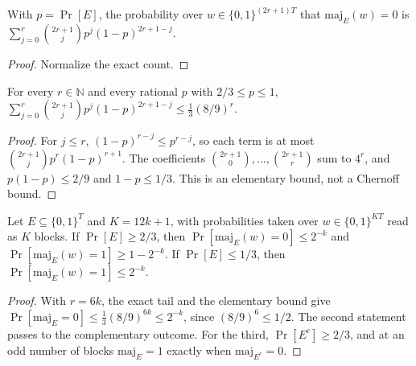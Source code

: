 \begin{lemma}
  \label{lem:encodings-majority-tail}
  \leanok
  With $p = \Pr[E]$, the probability over $w \in \{0,1\}^{(2r+1)T}$ that
  $\mathrm{maj}_E(w) = 0$ is
  $\sum_{j=0}^{r} \binom{2r+1}{j} p^j (1-p)^{2r+1-j}$.
\end{lemma}
\begin{proof}
  \leanok
  Normalize the exact count.
\end{proof}

\begin{lemma}
  \label{lem:encodings-binomial-tail}
  \leanok
  For every $r \in \mathbb{N}$ and every rational $p$ with
  $2/3 \le p \le 1$,
  $\sum_{j=0}^{r} \binom{2r+1}{j} p^j (1-p)^{2r+1-j} \le \frac13 (8/9)^r$.
\end{lemma}
\begin{proof}
  \leanok
  For $j \le r$, $(1-p)^{r-j} \le p^{r-j}$, so each term is at most
  $\binom{2r+1}{j} p^r (1-p)^{r+1}$. The coefficients
  $\binom{2r+1}{0}, \dots, \binom{2r+1}{r}$ sum to $4^r$, and
  $p(1-p) \le 2/9$ and $1 - p \le 1/3$. This is an elementary bound, not a
  Chernoff bound.
\end{proof}

\begin{theorem}
  \label{thm:encodings-amplification}
  \leanok
  Let $E \subseteq \{0,1\}^T$ and $K = 12k + 1$, with probabilities taken
  over $w \in \{0,1\}^{KT}$ read as $K$ blocks. If $\Pr[E] \ge 2/3$, then
  $\Pr[\mathrm{maj}_E(w) = 0] \le 2^{-k}$ and
  $\Pr[\mathrm{maj}_E(w) = 1] \ge 1 - 2^{-k}$. If $\Pr[E] \le 1/3$, then
  $\Pr[\mathrm{maj}_E(w) = 1] \le 2^{-k}$.
\end{theorem}
\begin{proof}
  \leanok
  With $r = 6k$, the exact tail and the elementary bound give
  $\Pr[\mathrm{maj}_E = 0] \le \frac13 (8/9)^{6k} \le 2^{-k}$, since
  $(8/9)^6 \le 1/2$. The second statement passes to the complementary
  outcome. For the third, $\Pr[E^c] \ge 2/3$, and at an odd number of blocks
  $\mathrm{maj}_E = 1$ exactly when $\mathrm{maj}_{E^c} = 0$.
\end{proof}

